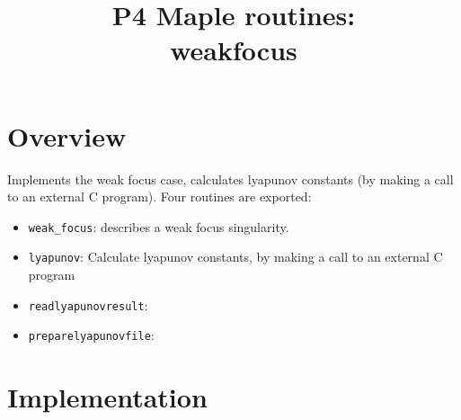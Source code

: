 \documentclass[a4paper,10pt]{article}
\title{P4 Maple routines:\\weakfocus}
\author{}
\date{}
\begin{document}
\maketitle

\section{Overview}

Implements the weak focus case, calculates lyapunov constants (by making a call to an external C program).
Four routines are exported:
\begin{itemize}
\item   \verb+weak_focus+: describes a weak focus singularity.
\item   \verb+lyapunov+: Calculate lyapunov constants, by making a call to an external C program
\item   \verb+readlyapunovresult+:
\item   \verb+preparelyapunovfile+:
\end{itemize}

\section{Implementation}
\end{document}
